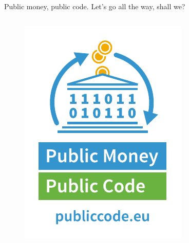 \documentclass[aspectratio=169]{beamer}
\begin{document}
\begin{frame}[shrink=8]{Public money, public code. Let's go all the way, shall we?}
\begin{columns}[T]
    \vspace{2mm}
    \begin{figure}
      \centering
      \includegraphics[width=\textwidth]{images/logos/FSFE_Public_Money_Public_Code_logo.pdf}
    \end{figure}
  \end{columns}
\end{frame}
\end{document}
